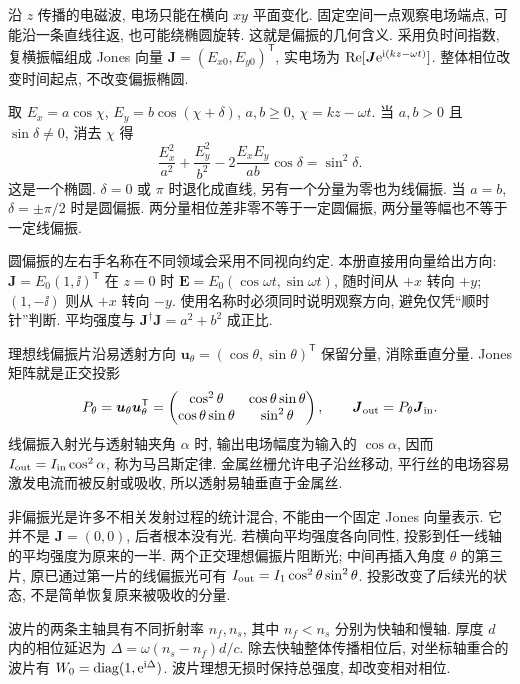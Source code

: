 \label{ch:polar}
沿 $z$ 传播的电磁波, 电场只能在横向 $xy$ 平面变化. 固定空间一点观察电场端点, 可能沿一条直线往返, 也可能绕椭圆旋转. 这就是偏振的几何含义. 采用负时间指数, 复横振幅组成 Jones 向量 $\boldsymbol J=(E_{x0},E_{y0})^{\mathsf T}$, 实电场为 $\operatorname{Re}[\boldsymbol J\mathrm e^{\mathrm i(kz-\omega t)}]$. 整体相位改变时间起点, 不改变偏振椭圆.

取 $E_x=a\cos\chi$, $E_y=b\cos(\chi+\delta)$, $a,b\ge0$, $\chi=kz-\omega t$. 当 $a,b>0$ 且 $\sin\delta\ne0$, 消去 $\chi$ 得
\[
\frac{E_x^2}{a^2}+\frac{E_y^2}{b^2}-2\frac{E_xE_y}{ab}\cos\delta=\sin^2\delta.
\]
这是一个椭圆. $\delta=0$ 或 $\pi$ 时退化成直线, 另有一个分量为零也为线偏振. 当 $a=b$, $\delta=\pm\pi/2$ 时是圆偏振. 两分量相位差非零不等于一定圆偏振, 两分量等幅也不等于一定线偏振.

圆偏振的左右手名称在不同领域会采用不同视向约定. 本册直接用向量给出方向: $\boldsymbol J=E_0(1,\ii)^{\mathsf T}$ 在 $z=0$ 时 $\boldsymbol E=E_0(\cos\omega t,\sin\omega t)$, 随时间从 $+x$ 转向 $+y$; $(1,-\ii)$ 则从 $+x$ 转向 $-y$. 使用名称时必须同时说明观察方向, 避免仅凭“顺时针”判断. 平均强度与 $\boldsymbol J^\dagger\boldsymbol J=a^2+b^2$ 成正比.

理想线偏振片沿易透射方向 $\boldsymbol u_\theta=(\cos\theta,\sin\theta)^{\mathsf T}$ 保留分量, 消除垂直分量. Jones 矩阵就是正交投影
\[
P_\theta=\boldsymbol u_\theta\boldsymbol u_\theta^{\mathsf T}
=\begin{pmatrix}\cos^2\theta&\cos\theta\sin\theta\\\cos\theta\sin\theta&\sin^2\theta\end{pmatrix},
\qquad \boldsymbol J_{\rm out}=P_\theta\boldsymbol J_{\rm in}.
\]
线偏振入射光与透射轴夹角 $\alpha$ 时, 输出电场幅度为输入的 $\cos\alpha$, 因而 $I_{\rm out}=I_{\rm in}\cos^2\alpha$, 称为马吕斯定律. 金属丝栅允许电子沿丝移动, 平行丝的电场容易激发电流而被反射或吸收, 所以透射易轴垂直于金属丝.

非偏振光是许多不相关发射过程的统计混合, 不能由一个固定 Jones 向量表示. 它并不是 $\boldsymbol J=(0,0)$, 后者根本没有光. 若横向平均强度各向同性, 投影到任一线轴的平均强度为原来的一半. 两个正交理想偏振片阻断光; 中间再插入角度 $\theta$ 的第三片, 原已通过第一片的线偏振光可有 $I_{\rm out}=I_1\cos^2\theta\sin^2\theta$. 投影改变了后续光的状态, 不是简单恢复原来被吸收的分量.

波片的两条主轴具有不同折射率 $n_f,n_s$, 其中 $n_f<n_s$ 分别为快轴和慢轴. 厚度 $d$ 内的相位延迟为 $\Delta=\omega(n_s-n_f)d/c$. 除去快轴整体传播相位后, 对坐标轴重合的波片有 $W_0=\operatorname{diag}(1,\mathrm e^{\mathrm i\Delta})$. 波片理想无损时保持总强度, 却改变相对相位.

